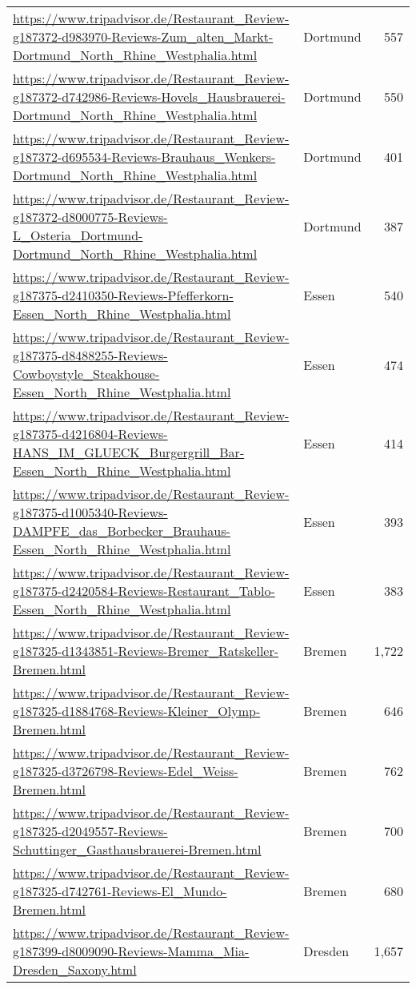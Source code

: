\begin{table}[H]
{\begin{tabular}{llr}
\url{https://www.tripadvisor.de/Restaurant\_Review-g187372-d983970-Reviews-Zum\_alten\_Markt-Dortmund\_North\_Rhine\_Westphalia.html} & Dortmund & 557 \\ 
\url{https://www.tripadvisor.de/Restaurant\_Review-g187372-d742986-Reviews-Hovels\_Hausbrauerei-Dortmund\_North\_Rhine\_Westphalia.html} & Dortmund & 550 \\ 
\url{https://www.tripadvisor.de/Restaurant\_Review-g187372-d695534-Reviews-Brauhaus\_Wenkers-Dortmund\_North\_Rhine\_Westphalia.html} & Dortmund & 401 \\ 
\url{https://www.tripadvisor.de/Restaurant\_Review-g187372-d8000775-Reviews-L\_Osteria\_Dortmund-Dortmund\_North\_Rhine\_Westphalia.html} & Dortmund & 387 \\ 
\url{https://www.tripadvisor.de/Restaurant\_Review-g187375-d2410350-Reviews-Pfefferkorn-Essen\_North\_Rhine\_Westphalia.html} & Essen & 540 \\ 
\url{https://www.tripadvisor.de/Restaurant\_Review-g187375-d8488255-Reviews-Cowboystyle\_Steakhouse-Essen\_North\_Rhine\_Westphalia.html} & Essen & 474 \\ 
\url{https://www.tripadvisor.de/Restaurant\_Review-g187375-d4216804-Reviews-HANS\_IM\_GLUECK\_Burgergrill\_Bar-Essen\_North\_Rhine\_Westphalia.html} & Essen & 414 \\ 
\url{https://www.tripadvisor.de/Restaurant\_Review-g187375-d1005340-Reviews-DAMPFE\_das\_Borbecker\_Brauhaus-Essen\_North\_Rhine\_Westphalia.html} & Essen & 393 \\ 
\url{https://www.tripadvisor.de/Restaurant\_Review-g187375-d2420584-Reviews-Restaurant\_Tablo-Essen\_North\_Rhine\_Westphalia.html} & Essen & 383 \\ 
\url{https://www.tripadvisor.de/Restaurant\_Review-g187325-d1343851-Reviews-Bremer\_Ratskeller-Bremen.html} & Bremen & 1,722 \\ 
\url{https://www.tripadvisor.de/Restaurant\_Review-g187325-d1884768-Reviews-Kleiner\_Olymp-Bremen.html} & Bremen & 646 \\ 
\url{https://www.tripadvisor.de/Restaurant\_Review-g187325-d3726798-Reviews-Edel\_Weiss-Bremen.html} & Bremen & 762 \\ 
\url{https://www.tripadvisor.de/Restaurant\_Review-g187325-d2049557-Reviews-Schuttinger\_Gasthausbrauerei-Bremen.html} & Bremen & 700 \\ 
\url{https://www.tripadvisor.de/Restaurant\_Review-g187325-d742761-Reviews-El\_Mundo-Bremen.html} & Bremen & 680 \\ 
\url{https://www.tripadvisor.de/Restaurant\_Review-g187399-d8009090-Reviews-Mamma\_Mia-Dresden\_Saxony.html} & Dresden & 1,657 \\ 

\end{tabular}}
\end{table}
